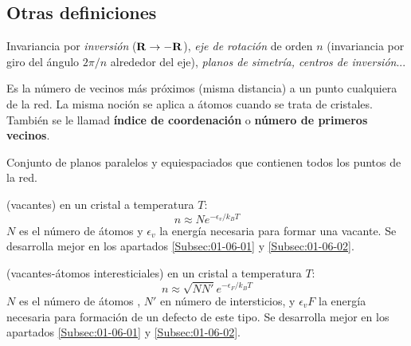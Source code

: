 \subsection{Otras definiciones}
  
\begin{definition}
    Invariancia por {\it inversión} ($\mathbf{R} \rightarrow - \mathbf{R}$), {\it eje de rotación} de orden $n$ (invariancia por giro del ángulo $2\pi/n$ alrededor del eje), {\it planos de simetría, centros de inversión}...    
\end{definition}

\begin{definition}
    Es la número de vecinos más próximos (misma distancia) a un punto cualquiera de la red. La misma noción se aplica a átomos cuando se trata de cristales. También se le llamad \textbf{índice de coordenación} o \textbf{número de primeros vecinos}.
\end{definition}

\begin{definition}
    Conjunto de planos paralelos y equiespaciados que contienen todos los puntos de la red. 
\end{definition}


\begin{definition}
    (vacantes) en un cristal a temperatura $T$:
    \begin{equation}
    n \approx N e^{-\epsilon_v /k_B T}
    \end{equation}
    $N$ es el número de átomos y $\epsilon_v$ la energía necesaria para formar una vacante. Se desarrolla mejor en los apartados \ref{Subsec:01-06-01} y \ref{Subsec:01-06-02}.
\end{definition}


\begin{definition}
    (vacantes-átomos interesticiales) en un cristal a temperatura $T$:
    \begin{equation}
    n \approx \sqrt{NN'} e^{-\epsilon_F /k_B T}
    \end{equation}
    $N$ es el número de átomos , $N'$ en número de intersticios, y $\epsilon_vF$ la energía necesaria para formación de un defecto de este tipo. Se desarrolla mejor en los apartados \ref{Subsec:01-06-01} y \ref{Subsec:01-06-02}.
\end{definition}
    

